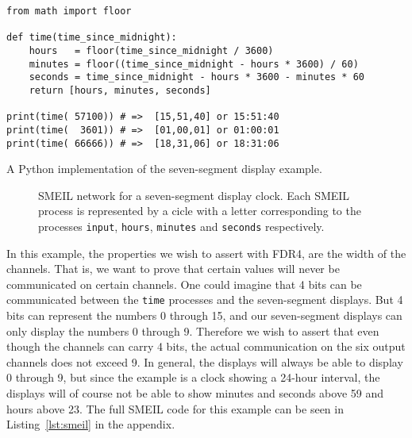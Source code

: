 \begin{listing}
\begin{verbatim}
from math import floor

def time(time_since_midnight):
    hours   = floor(time_since_midnight / 3600)
    minutes = floor((time_since_midnight - hours * 3600) / 60)
    seconds = time_since_midnight - hours * 3600 - minutes * 60
    return [hours, minutes, seconds]

print(time( 57100)) # =>  [15,51,40] or 15:51:40
print(time(  3601)) # =>  [01,00,01] or 01:00:01
print(time( 66666)) # =>  [18,31,06] or 18:31:06
\end{verbatim}
\caption{A Python implementation of the seven-segment display example.}
\label{lst:python}
\end{listing}
\begin{figure}[!ht]
  \centering
  \caption{SMEIL network for a seven-segment display clock. Each SMEIL process is represented by a cicle with a letter corresponding to the processes \texttt{input}, \texttt{hours}, \texttt{minutes} and \texttt{seconds} respectively.}
  \label{fig:smeil_network}
\end{figure}

In this example, the properties we wish to assert with FDR4, are the width of the channels. That is, we want to prove that certain values will never be communicated on certain channels. One could imagine that 4 bits can be communicated between the \texttt{time} processes and the seven-segment displays. But 4 bits can represent the numbers 0 through 15, and our seven-segment displays can only display the numbers 0 through 9. Therefore we wish to assert that even though the channels can carry 4 bits, the actual communication on the six output channels does not exceed 9. In general, the displays will always be able to display 0 through 9, but since the example is a clock showing a 24-hour interval, the displays will of course not be able to show minutes and seconds above 59 and hours above 23. The full SMEIL code for this example can be seen in Listing~\ref{lst:smeil} in the appendix.
